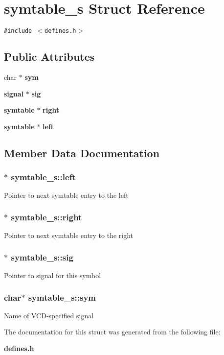\section{symtable\_\-s  Struct Reference}
\label{structsymtable__s}
{\tt \#include $<$defines.h$>$}

\subsection*{Public Attributes}
\begin{CompactItemize}
\item 
char $\ast$ {\bf sym}
\item 
{\bf signal} $\ast$ {\bf sig}
\item 
{\bf symtable} $\ast$ {\bf right}
\item 
{\bf symtable} $\ast$ {\bf left}
\end{CompactItemize}


\subsection{Member Data Documentation}
\subsubsection{$\ast$ symtable\_\-s::left}\label{structsymtable__s_m3}


Pointer to next symtable entry to the left 
\subsubsection{$\ast$ symtable\_\-s::right}\label{structsymtable__s_m2}


Pointer to next symtable entry to the right 
\subsubsection{$\ast$ symtable\_\-s::sig}\label{structsymtable__s_m1}


Pointer to signal for this symbol 
\subsubsection{\setlength{\rightskip}{0pt plus 5cm}char$\ast$ symtable\_\-s::sym}\label{structsymtable__s_m0}


Name of VCD-specified signal 

The documentation for this struct was generated from the following file:\begin{CompactItemize}
\item 
{\bf defines.h}\end{CompactItemize}
